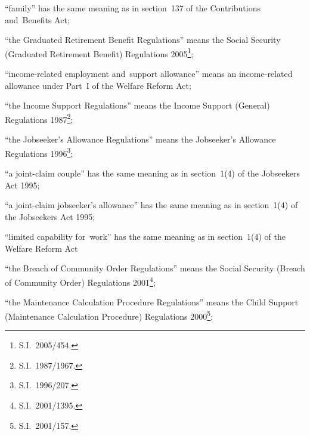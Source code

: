\documentclass[12pt,a4paper]{article}
\begin{document}
\begin{enumerate}
“family” has the same meaning as in section~137 of the Contributions and~Benefits Act;


“the Graduated Retirement Benefit Regulations” means the Social Security (Graduated Retirement Benefit) Regulations 2005\footnote{S.I.~2005/454.};

“income-related employment and~support allowance” means an income-related allowance under Part~I of the Welfare Reform Act;

“the Income Support Regulations” means the Income Support (General) Regulations 1987\footnote{\frenchspacing S.I.~1987/1967.};

“the Jobseeker’s Allowance Regulations” means the Jobseeker’s Allowance Regulations 1996\footnote{\frenchspacing S.I.~1996/207.};

“a joint-claim couple” has the same meaning as in section~1(4) of the Jobseekers Act 1995;

    “a joint-claim jobseeker’s allowance” has the same meaning as in section~1(4) of the Jobseekers Act 1995;


“limited capability for~work” has the same meaning as in section~1(4) of the Welfare Reform Act

“the Breach of Community Order Regulations” means the Social Security (Breach of Community Order) Regulations 2001\footnote{S.I.\ 2001/1395.};

“the Maintenance Calculation Procedure Regulations” means the Child Support (Maintenance Calculation Procedure) Regulations 2000\footnote{\frenchspacing S.I.~2001/157.};


\end{enumerate}
\end{document}
